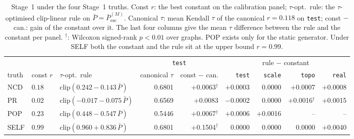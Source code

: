 \begin{table}[!htbp]
\centering
\footnotesize\setlength{\tabcolsep}{4pt}
\caption{Stage~1 under the four Stage~1 truths. Const $r$: the best constant on the calibration panel; $\tau$-opt.\ rule: the $\tau$-optimised clip-linear rule on $\bar P=\bar P^{(M)}_{\mathrm{esc}}$. Canonical $\tau$: mean Kendall $\tau$ of the canonical $r=0.118$ on \texttt{test}; const $-$ can.: gain of the constant over it. The last four columns give the mean $\tau$ difference between the rule and the constant per panel. $^{\dagger}$: Wilcoxon signed-rank $p<0.01$ over graphs. POP exists only for the static generator. Under SELF both the constant and the rule sit at the upper bound $r=0.99$.}
\label{tab:stage1truth}
\begin{tabular}{@{}lllrrrrrr@{}}
\toprule
& & & \multicolumn{2}{c}{\texttt{test}} & \multicolumn{4}{c}{rule $-$ constant} \\
\cmidrule(lr){4-5}\cmidrule(l){6-9}
truth & const $r$ & $\tau$-opt.\ rule & canonical $\tau$ & const $-$ can. & \texttt{test} & \texttt{scale} & \texttt{topo} & \texttt{real} \\
\midrule
NCD & $0.18$ & $\mathrm{clip}(0.242-0.143\,\bar P)$ & 0.6801 & $+$0.0063$^{\dagger}$ & $+$0.0003 & 0.0000 & $+$0.0007 & $+$0.0008 \\
PR & $0.02$ & $\mathrm{clip}(-0.017-0.075\,\bar P)$ & 0.6569 & $+$0.0083 & $-$0.0002 & 0.0000 & $+$0.0016$^{\dagger}$ & $+$0.0015 \\
POP & $0.23$ & $\mathrm{clip}(0.448-0.547\,\bar P)$ & 0.5446 & $+$0.0067$^{\dagger}$ & $+$0.0006 & $+$0.0016 & -- & -- \\
SELF & $0.99$ & $\mathrm{clip}(0.960+0.836\,\bar P)$ & 0.6801 & $+$0.1504$^{\dagger}$ & 0.0000 & 0.0000 & 0.0000 & $+$0.0040 \\
\bottomrule
\end{tabular}
\end{table}
